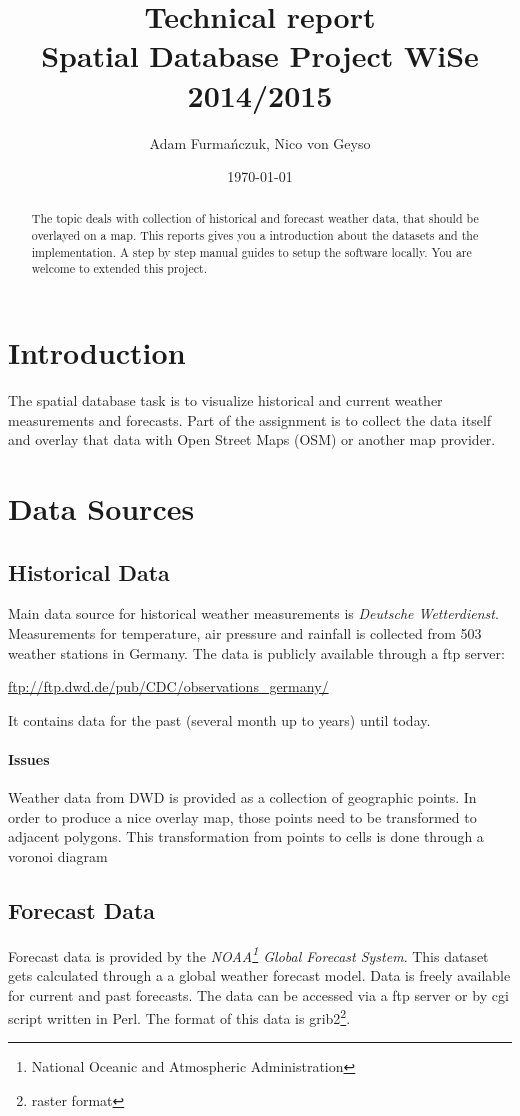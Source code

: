 \documentclass{scrartcl}
\date{\today}
\author{Adam Furmańczuk, Nico von Geyso}
\title{
  Technical report \\
  \vspace{0.5cm}
  \small{Spatial Database Project WiSe 2014/2015}
}
\begin{document}
\maketitle

\begin{abstract}
  The topic deals with collection of historical and forecast weather data,
  that should be overlayed on a map. This reports gives you a introduction
  about the datasets and the implementation. A step by step manual guides
  to setup the software locally. You are welcome to extended this project.
\end{abstract}


\section{Introduction}
The spatial database task is to visualize historical and current weather measurements and forecasts. Part of the assignment is to collect the data itself and overlay that data with Open Street Maps (OSM) or another map provider.


\section{Data Sources}
\subsection{Historical Data}
Main data source for historical weather measurements is \textit{Deutsche
Wetterdienst}. Measurements for temperature, air pressure and rainfall is
collected from 503 weather stations in Germany. The data is publicly available
through a ftp server:

\begin{center}\url{ftp://ftp.dwd.de/pub/CDC/observations_germany/}\end{center}

It contains data for the past (several month up to years) until today.

\paragraph{Issues}
Weather data from DWD is provided as a collection of geographic points. In order
to produce a nice overlay map, those points need to be transformed to adjacent
polygons. This transformation from points to cells is done through a voronoi
diagram

\subsection{Forecast Data}
Forecast data is provided by the \textit{NOAA\footnote{National Oceanic and
Atmospheric Administration} Global Forecast System}. This dataset gets
calculated through a a global weather forecast model. Data is freely available
for current and past forecasts. The data can be accessed via a ftp server or by
cgi script written in Perl. The format of this data is grib2\footnote{raster
format}.
\end{document}
